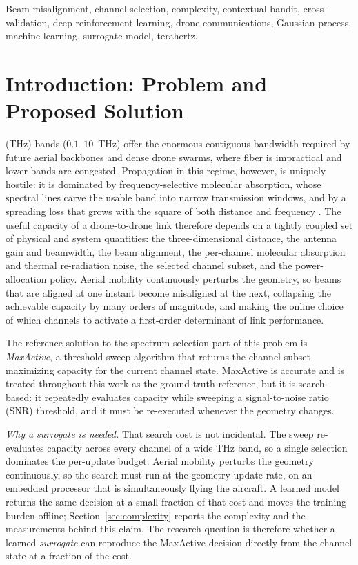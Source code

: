 \documentclass[journal]{IEEEtran}
\begin{document}
\begin{IEEEkeywords}
Beam misalignment, channel selection, complexity, contextual bandit, cross-validation,
deep reinforcement learning, drone communications, Gaussian process, machine learning,
surrogate model, terahertz.
\end{IEEEkeywords}

\section{Introduction: Problem and Proposed Solution}
 (THz) bands ($0.1$--$10$~THz) offer the enormous contiguous
bandwidth required by future aerial backbones and dense drone swarms, where fiber is
impractical and lower bands are congested. Propagation in this regime, however, is
uniquely hostile: it is dominated by frequency-selective molecular absorption, whose
spectral lines carve the usable band into narrow transmission windows, and by a
spreading loss that grows with the square of both distance and frequency
\cite{jornet}. The useful capacity of a drone-to-drone link therefore depends on a
tightly coupled set of physical and system quantities: the three-dimensional distance,
the antenna gain and beamwidth, the beam alignment, the per-channel molecular
absorption and thermal re-radiation noise, the selected channel subset, and the
power-allocation policy. Aerial mobility continuously perturbs the geometry, so beams
that are aligned at one instant become misaligned at the next, collapsing the
achievable capacity by many orders of magnitude, and making the online choice of which
channels to activate a first-order determinant of link performance.

The reference solution to the spectrum-selection part of this problem is
\emph{MaxActive}, a threshold-sweep algorithm that returns the channel subset
maximizing capacity for the current channel state. MaxActive is accurate and is treated
throughout this work as the ground-truth reference, but it is search-based: it
repeatedly evaluates capacity while sweeping a signal-to-noise ratio (SNR) threshold,
and it must be re-executed whenever the geometry changes.

\emph{Why a surrogate is needed.} That search cost is not incidental. The sweep
re-evaluates capacity across every channel of a wide THz band, so a single selection
dominates the per-update budget. Aerial mobility perturbs the geometry continuously, so
the search must run at the geometry-update rate, on an embedded processor that is
simultaneously flying the aircraft. A learned model returns the same decision at a small
fraction of that cost and moves the training burden offline;
Section~\ref{sec:complexity} reports the complexity and the measurements behind this
claim. The research question is therefore whether a learned \emph{surrogate} can reproduce
the MaxActive decision directly from the channel state at a fraction of the cost.
\end{document}
